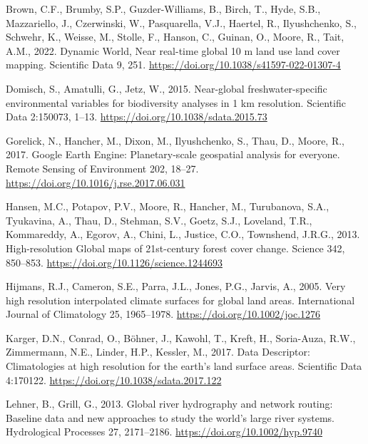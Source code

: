 \documentclass[
]{book}
\newlength{\cslhangindent}
\newenvironment{CSLReferences}[2] %
 {\begin{list}{}{%
  \setlength{\itemindent}{0pt}
  \setlength{\leftmargin}{0pt}
  \setlength{\parsep}{0pt}
  \ifodd #1
   \setlength{\leftmargin}{\cslhangindent}
   \setlength{\itemindent}{-1\cslhangindent}
  \fi
  \setlength{\itemsep}{#2\baselineskip}}}
 {\end{list}}
\begin{document}
\label{refs}
\begin{CSLReferences}{1}{0}
Brown, C.F., Brumby, S.P., Guzder-Williams, B., Birch, T., Hyde, S.B., Mazzariello, J., Czerwinski, W., Pasquarella, V.J., Haertel, R., Ilyushchenko, S., Schwehr, K., Weisse, M., Stolle, F., Hanson, C., Guinan, O., Moore, R., Tait, A.M., 2022. {Dynamic} {World}, {Near} real-time global 10 m land use land cover mapping. Scientific Data 9, 251. \url{https://doi.org/10.1038/s41597-022-01307-4}

Domisch, S., Amatulli, G., Jetz, W., 2015. Near-global freshwater-specific environmental variables for biodiversity analyses in 1 km resolution. Scientific Data 2:150073, 1--13. \url{https://doi.org/10.1038/sdata.2015.73}

Gorelick, N., Hancher, M., Dixon, M., Ilyushchenko, S., Thau, D., Moore, R., 2017. {Google} {Earth} {Engine}: {Planetary-scale} geospatial analysis for everyone. Remote Sensing of Environment 202, 18--27. \url{https://doi.org/10.1016/j.rse.2017.06.031}

Hansen, M.C., Potapov, P.V., Moore, R., Hancher, M., Turubanova, S.A., Tyukavina, A., Thau, D., Stehman, S.V., Goetz, S.J., Loveland, T.R., Kommareddy, A., Egorov, A., Chini, L., Justice, C.O., Townshend, J.R.G., 2013. {High}-resolution {Global} maps of 21st-century forest cover change. Science 342, 850--853. \url{https://doi.org/10.1126/science.1244693}

Hijmans, R.J., Cameron, S.E., Parra, J.L., Jones, P.G., Jarvis, A., 2005. Very high resolution interpolated climate surfaces for global land areas. International Journal of Climatology 25, 1965--1978. \url{https://doi.org/10.1002/joc.1276}

Karger, D.N., Conrad, O., Böhner, J., Kawohl, T., Kreft, H., Soria-Auza, R.W., Zimmermann, N.E., Linder, H.P., Kessler, M., 2017. {Data} {Descriptor}: {Climatologies} at high resolution for the earth's land surface areas. Scientific Data 4:170122. \url{https://doi.org/10.1038/sdata.2017.122}

Lehner, B., Grill, G., 2013. Global river hydrography and network routing: Baseline data and new approaches to study the world's large river systems. Hydrological Processes 27, 2171--2186. \url{https://doi.org/10.1002/hyp.9740}


\end{CSLReferences}
\end{document}
